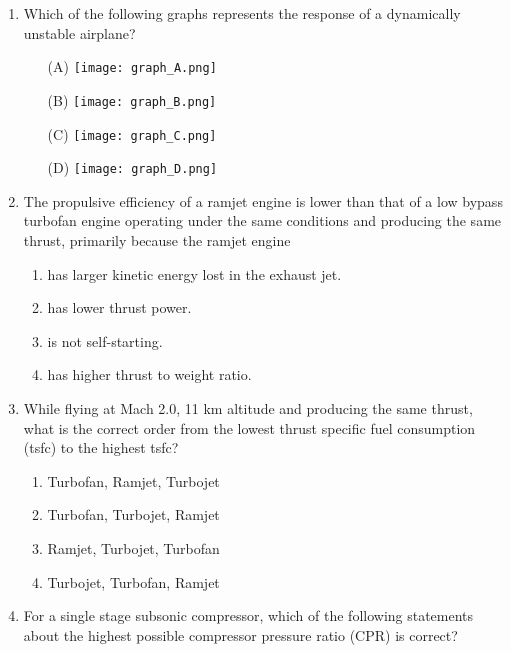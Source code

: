 \documentclass[12pt]{article}
\begin{document}
\begin{enumerate}[label=Q.\arabic*]
	\item Which of the following graphs represents the response of a dynamically unstable airplane?
		\begin{multicols}{2}
			\begin{itemize}
				\item[(A)] 
					\texttt{[image: graph\_A.png]}

				\item[(B)] 
					\texttt{[image: graph\_B.png]}

				\item[(C)] 
					\texttt{[image: graph\_C.png]}

				\item[(D)] 
					\texttt{[image: graph\_D.png]}
			\end{itemize}
		\end{multicols}
	\item The propulsive efficiency of a ramjet engine is lower than that of a low bypass turbofan engine operating under the same conditions and producing the same thrust, primarily because the ramjet engine
		\begin{enumerate}[label=(\Alph*)]
			\item has larger kinetic energy lost in the exhaust jet.
			\item has lower thrust power.
			\item is not self-starting.
			\item has higher thrust to weight ratio.
		\end{enumerate}
		\newpage
	\item While flying at Mach 2.0, 11 km altitude and producing the same thrust, what is the correct order from the lowest thrust specific fuel consumption (tsfc) to the highest tsfc?
		\begin{multicols}{2}
			\begin{enumerate}[label=(\Alph*)]
				\item Turbofan, Ramjet, Turbojet
				\item Turbofan, Turbojet, Ramjet
				\item Ramjet, Turbojet, Turbofan
				\item Turbojet, Turbofan, Ramjet
			\end{enumerate}
		\end{multicols}
	\item For a single stage subsonic compressor, which of the following statements about the highest possible compressor pressure ratio (CPR) is correct?

\end{enumerate}
\end{document}
